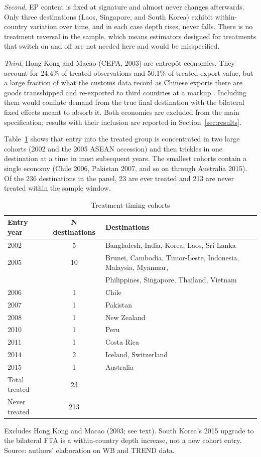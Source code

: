 \documentclass[12pt]{article}
\begin{document}
\emph{Second}, EP content is fixed at signature and almost never changes afterwards. Only
three destinations (Laos, Singapore, and South Korea) exhibit within-country variation
over time, and in each case depth rises, never falls. There is no treatment reversal
in the sample, which means estimators designed for treatments that switch on and off are
not needed here and would be misspecified.

\emph{Third}, Hong Kong and Macao (CEPA, 2003) are entrepôt economies. They account for
24.4\% of treated observations and 50.1\% of treated export value, but a large fraction
of what the customs data record as Chinese exports there are goods transshipped and
re-exported to third countries at a markup \citep{feenstra2004}. Including them would
conflate demand from the true final destination with the bilateral fixed effects meant to
absorb it. Both economies are excluded from the main specification; results with their
inclusion are reported in Section~\ref{sec:results}.

Table~\ref{tab:cohorts} shows that entry into the treated group is concentrated in two
large cohorts (2002 and the 2005 ASEAN accession) and then trickles in one destination
at a time in most subsequent years. The smallest cohorts contain a single economy
(Chile 2006, Pakistan 2007, and so on through Australia 2015). Of the 236 destinations
in the panel, 23 are ever treated and 213 are never treated within the sample window.

\begin{table}[htbp]
\centering
\caption{Treatment-timing cohorts}
\label{tab:cohorts}
\small
\begin{threeparttable}
\begin{tabular}{lcl}
\toprule
Entry year & N destinations & Destinations \\
\midrule
2002 & 5 & Bangladesh, India, Korea, Laos, Sri Lanka \\
2005 & 10 & Brunei, Cambodia, Timor-Leste, Indonesia, Malaysia, Myanmar, \\
     &    & Philippines, Singapore, Thailand, Vietnam \\
2006 & 1  & Chile \\
2007 & 1  & Pakistan \\
2008 & 1  & New Zealand \\
2010 & 1  & Peru \\
2011 & 1  & Costa Rica \\
2014 & 2  & Iceland, Switzerland \\
2015 & 1  & Australia \\
\midrule
Total treated & 23 & \\
Never treated & 213 & \\
\bottomrule
\end{tabular}
\begin{tablenotes}\footnotesize
\item Excludes Hong Kong and Macao (2003; see text). South Korea's 2015 upgrade to
the bilateral FTA is a within-country depth increase, not a new cohort entry.
Source: authors' elaboration on WB and TREND data.
\end{tablenotes}
\end{threeparttable}
\end{table}
\end{document}
